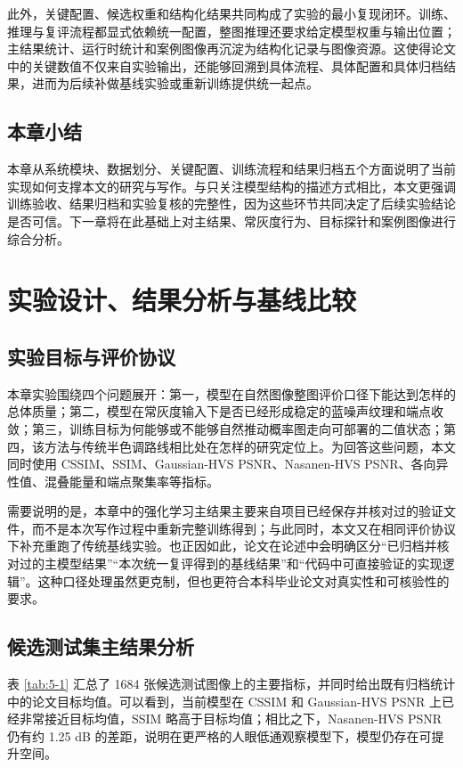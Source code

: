 \documentclass[thesis]{../zstucs-graduation-project}
\begin{document}
    此外，关键配置、候选权重和结构化结果共同构成了实验的最小复现闭环。训练、推理与复评流程都显式依赖统一配置，整图推理还要求给定模型权重与输出位置；主结果统计、运行时统计和案例图像再沉淀为结构化记录与图像资源。这使得论文中的关键数值不仅来自实验输出，还能够回溯到具体流程、具体配置和具体归档结果，进而为后续补做基线实验或重新训练提供统一起点。

\subsection{本章小结}
本章从系统模块、数据划分、关键配置、训练流程和结果归档五个方面说明了当前实现如何支撑本文的研究与写作。与只关注模型结构的描述方式相比，本文更强调训练验收、结果归档和实验复核的完整性，因为这些环节共同决定了后续实验结论是否可信。下一章将在此基础上对主结果、常灰度行为、目标探针和案例图像进行综合分析。

\section{实验设计、结果分析与基线比较}

\subsection{实验目标与评价协议}
本章实验围绕四个问题展开：第一，模型在自然图像整图评价口径下能达到怎样的总体质量；第二，模型在常灰度输入下是否已经形成稳定的蓝噪声纹理和端点收敛；第三，训练目标为何能够或不能够自然推动概率图走向可部署的二值状态；第四，该方法与传统半色调路线相比处在怎样的研究定位上。为回答这些问题，本文同时使用 CSSIM、SSIM、Gaussian-HVS PSNR、Nasanen-HVS PSNR、各向异性值、混叠能量和端点聚集率等指标。

需要说明的是，本章中的强化学习主结果主要来自项目已经保存并核对过的验证文件，而不是本次写作过程中重新完整训练得到；与此同时，本文又在相同评价协议下补充重跑了传统基线实验。也正因如此，论文在论述中会明确区分“已归档并核对过的主模型结果”“本次统一复评得到的基线结果”和“代码中可直接验证的实现逻辑”。这种口径处理虽然更克制，但也更符合本科毕业论文对真实性和可核验性的要求。

\subsection{候选测试集主结果分析}
表 \ref{tab:5-1} 汇总了 1684 张候选测试图像上的主要指标，并同时给出既有归档统计中的论文目标均值。可以看到，当前模型在 CSSIM 和 Gaussian-HVS PSNR 上已经非常接近目标均值，SSIM 略高于目标均值；相比之下，Nasanen-HVS PSNR 仍有约 1.25 dB 的差距，说明在更严格的人眼低通观察模型下，模型仍存在可提升空间。
\end{document}
